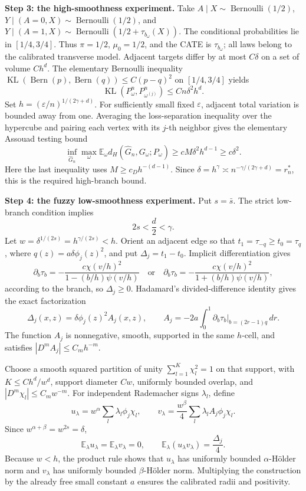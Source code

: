 \textbf{Step 3: the high-smoothness experiment.} Take \(A\mid X\sim\operatorname{Bernoulli}(1/2)\), \(Y\mid(A=0,X)\sim\operatorname{Bernoulli}(1/2)\), and \(Y\mid(A=1,X)\sim\operatorname{Bernoulli}(1/2+\tau_{b_\omega}(X))\). The conditional probabilities lie in \([1/4,3/4]\). Thus \(\pi=1/2\), \(\mu_0=1/2\), and the CATE is \(\tau_{b_\omega}\); all laws belong to the calibrated transverse model. Adjacent targets differ by at most \(C\delta\) on a set of volume \(Ch^d\). The elementary Bernoulli inequality \(\operatorname{KL}(\operatorname{Bern}(p),\operatorname{Bern}(q))\le C(p-q)^2\) on \([1/4,3/4]\) yields
\[
\operatorname{KL}(P_\omega^n,P_{\omega^{(j)}}^n)\le Cn\delta^2h^d.
\]
Set \(h=(\varepsilon/n)^{1/(2\gamma+d)}\). For sufficiently small fixed \(\varepsilon\), adjacent total variation is bounded away from one. Averaging the loss-separation inequality over the hypercube and pairing each vertex with its \(j\)-th neighbor gives the elementary Assouad testing bound
\[
\inf_{\widehat G_n}\max_\omega \mathbb E_\omega d_H(\widehat G_n,G_\omega;P_\omega)
\ge cM\delta^2h^{d-1}\ge c\delta^2.
\]
Here the last inequality uses \(M\ge c_Dh^{-(d-1)}\). Since \(\delta=h^\gamma\asymp n^{-\gamma/(2\gamma+d)}=r_n^*\), this is the required high-branch bound.

\textbf{Step 4: the fuzzy low-smoothness experiment.} Put \(s=\bar s\). The strict low-branch condition implies
\[
2s<\frac{d}{2}<\gamma.
\]
Let \(w=\delta^{1/(2s)}=h^{\gamma/(2s)}<h\). Orient an adjacent edge so that \(t_1=\tau_{-q}\ge t_0=\tau_q\), where \(q(z)=a\delta\phi_j(z)^2\), and put \(\Delta_j=t_1-t_0\). Implicit differentiation gives
\[
\partial_b\tau_b=-\frac{c\chi(v/h)^2}{1-(b/h)\psi(v/h)}
\quad\text{or}\quad
\partial_b\tau_b=-\frac{c\chi(v/h)^2}{1+(b/h)\psi(v/h)},
\]
according to the branch, so \(\Delta_j\ge0\). Hadamard's divided-difference identity gives the exact factorization
\[
\Delta_j(x,z)=\delta\phi_j(z)^2A_j(x,z),
\qquad
A_j=-2a\int_0^1\left.\partial_b\tau_b\right|_{b=(2r-1)q}\,dr.
\]
The function \(A_j\) is nonnegative, smooth, supported in the same \(h\)-cell, and satisfies \(|D^mA_j|\le C_mh^{-m}\).

Choose a smooth squared partition of unity \(\sum_{l=1}^K\chi_l^2=1\) on that support, with \(K\le Ch^d/w^d\), support diameter \(Cw\), uniformly bounded overlap, and \(|D^m\chi_l|\le C_mw^{-m}\). For independent Rademacher signs \(\lambda_l\), define
\[
u_\lambda=w^\alpha\sum_l\lambda_l\phi_j\chi_l,
\qquad
v_\lambda=\frac{w^\beta}{4}\sum_l\lambda_lA_j\phi_j\chi_l.
\]
Since \(w^{\alpha+\beta}=w^{2s}=\delta\),
\[
\mathbb E_\lambda u_\lambda=\mathbb E_\lambda v_\lambda=0,
\qquad
\mathbb E_\lambda(u_\lambda v_\lambda)=\frac{\Delta_j}{4}.
\]
Because \(w<h\), the product rule shows that \(u_\lambda\) has uniformly bounded \(\alpha\)-Hölder norm and \(v_\lambda\) has uniformly bounded \(\beta\)-Hölder norm. Multiplying the construction by the already free small constant \(a\) ensures the calibrated radii and positivity.

